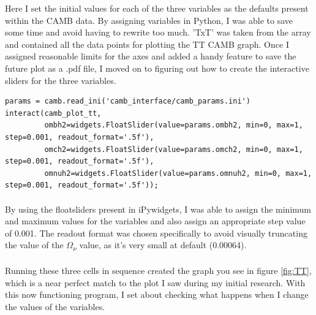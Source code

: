 \documentclass[twoside, fontsize=12pt,
     bibliography=totoc, %
     listof=totoc, %
     index=totoc, %
     onehalfspacing %
]{_MScDiss2017_cls}
\begin{document}

Here I set the initial values for each of the three variables as the defaults present within the CAMB data. By assigning variables in Python, I was able to save some time and avoid having to rewrite too much. 'TxT' was taken from the array and contained all the data points for plotting the TT CAMB graph. Once I assigned reasonable limits for the axes and added a handy feature to save the future plot as a .pdf file, I moved on to figuring out how to create the interactive sliders for the three variables.



\begin{lstfloat}
\begin{lstlisting}[caption={Creating the first plot}, captionpos=b]
params = camb.read_ini('camb_interface/camb_params.ini')
interact(camb_plot_tt,
         ombh2=widgets.FloatSlider(value=params.ombh2, min=0, max=1, step=0.001, readout_format='.5f'),
         omch2=widgets.FloatSlider(value=params.omch2, min=0, max=1, step=0.001, readout_format='.5f'),
         omnuh2=widgets.FloatSlider(value=params.omnuh2, min=0, max=1, step=0.001, readout_format='.5f'));
\end{lstlisting}
\end{lstfloat}

\paragraph{}

By using the floatsliders present in iPywidgets, I was able to assign the minimum and maximum values for the variables and also assign an appropriate step value of 0.001. The readout format was chosen specifically to avoid visually truncating the value of the $\Omega$\textsubscript{$\nu$} value, as it's very small at default (0.00064).

\paragraph{}

Running these three cells in sequence created the graph you see in figure \ref{fig:TT}, which is a near perfect match to the plot I saw during my initial research. With this now functioning program, I set about checking what happens when I change the values of the variables.
\end{document}

